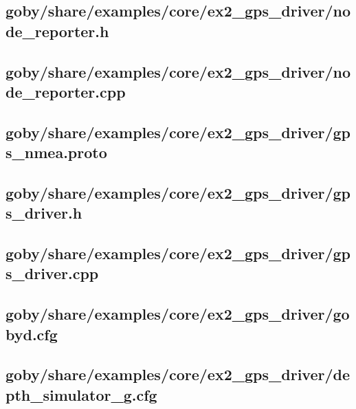 \subsection{goby/share/examples/core/ex2\_gps\_driver/node\_reporter.h} \label{sec:gps_driver:node_reporter.h}
\resetbvlinenumber


\subsection{goby/share/examples/core/ex2\_gps\_driver/node\_reporter.cpp} \label{sec:gps_driver:node_reporter.cpp}
\resetbvlinenumber


\subsection{goby/share/examples/core/ex2\_gps\_driver/gps\_nmea.proto} \label{sec:gps_driver:gps_nmea.proto}
\resetbvlinenumber

\subsection{goby/share/examples/core/ex2\_gps\_driver/gps\_driver.h} \label{sec:gps_driver:gps_driver.h}
\resetbvlinenumber
\subsection{goby/share/examples/core/ex2\_gps\_driver/gps\_driver.cpp} \label{sec:gps_driver:gps_driver.cpp}
\resetbvlinenumber

\subsection{goby/share/examples/core/ex2\_gps\_driver/gobyd.cfg} \label{sec:gps_driver:gobyd.cfg}
\resetbvlinenumber

\subsection{goby/share/examples/core/ex2\_gps\_driver/depth\_simulator\_g.cfg} \label{sec:gps_driver:depth_simulator_g.cfg}
\resetbvlinenumber

